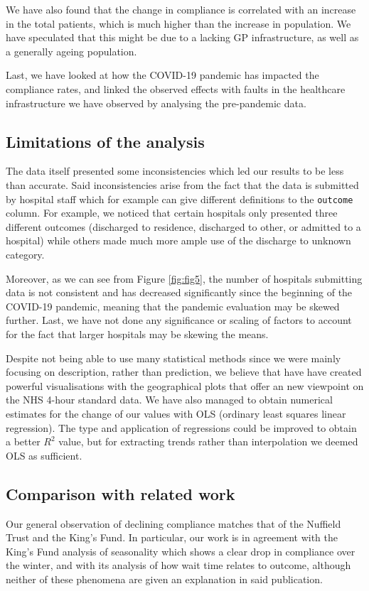 \documentclass[12pt,a4paper]{article}
\def\code#1{\texttt{#1}}
\begin{document}
We have also found that the change in compliance is correlated with an increase in the total patients, which is much higher than the increase in population. We have speculated that this might be due to a lacking GP infrastructure, as well as a generally ageing population.

Last, we have looked at how the COVID-19 pandemic has impacted the compliance rates, and linked the observed effects with faults in the healthcare infrastructure we have observed by analysing the pre-pandemic data.

\subsection{Limitations of the analysis}
The data itself presented some inconsistencies which led our results to be less than accurate. Said inconsistencies arise from the fact that the data is submitted by hospital staff which for example can give different definitions to the \code{outcome} column. For example, we noticed that certain hospitals only presented three different outcomes (discharged to residence, discharged to other, or admitted to a hospital) while others made much more ample use of the discharge to unknown category.

Moreover, as we can see from Figure \ref{fig:fig5}, the number of hospitals submitting data is not consistent and has decreased significantly since the beginning of the COVID-19 pandemic, meaning that the pandemic evaluation may be skewed further. Last, we have not done any significance or scaling of factors to account for the fact that larger hospitals may be skewing the means.

Despite not being able to use many statistical methods since we were mainly focusing on description, rather than prediction, we believe that have have created powerful visualisations with the geographical plots that offer an new viewpoint on the NHS 4-hour standard data. We have also managed to obtain numerical estimates for the change of our values with OLS (ordinary least squares linear regression). The type and application of regressions could be improved to obtain a better $R^2$ value, but for extracting trends rather than interpolation we deemed OLS as sufficient.

\subsection{Comparison with related work}

Our general observation of declining compliance matches that of the Nuffield Trust and the King's Fund.\cite{the_nuffield_trust_2022}\cite{the_kings_fund_2020} In particular, our work is in agreement with the King's Fund analysis of seasonality which shows a clear drop in compliance over the winter, and with its analysis of how wait time relates to outcome, although neither of these phenomena are given an explanation in said publication. 
\end{document}
